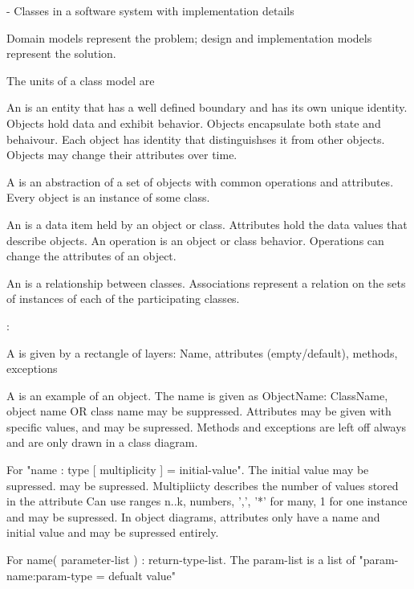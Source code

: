 \begin{compactitem}
\begin{compactitem}
\item {} - Classes in a software system with implementation details
\end{compactitem}
Domain models represent the problem; design and implementation models represent the solution.
\item The units of a class model are 
\begin{compactitem} 
\item An  is an entity that has a well defined boundary and has its own unique identity.
Objects hold data and exhibit behavior. Objects encapsulate both state and behaivour. Each object has identity that distinguishses it from other objects. Objects may change their attributes over time.
\item A  is an abstraction of a set of objects with common operations and attributes. Every object is an instance of some class.
\item An  is a data item held by an object or class. Attributes hold the data values that describe objects. 
An operation is an object or class behavior. Operations can change the attributes of an object.
\item An  is a relationship between classes. Associations  represent a relation on the sets of instances of each of the participating classes.
\end{compactitem}
\item {}:
\begin{compactitem}
\item A  is given by a rectangle of layers: Name, attributes (empty/default), methods, exceptions
\item A  is an example of an object. The name is given as ObjectName: ClassName, object name OR class name may be suppressed. Attributes may be given with specific values, and may be supressed. Methods and exceptions are left off always and are only drawn in a class diagram.
\item For  "name : type [ multiplicity ] = initial-value". The initial value may be supressed.  may be supressed. Multipliicty describes the number of values stored in the attribute Can use ranges n..k, numbers, ',', '*' for many, 1 for one instance and may be supressed. In object diagrams, attributes only have a name and initial value and may be supressed entirely. 
\item For  name( parameter-list ) : return-type-list. The param-list is a list of "param-name:param-type = defualt value"

\end{compactitem}
\end{compactitem}
